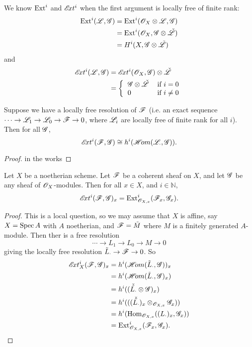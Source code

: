  \begin{corollary}\label{C:lec16}
 We know $\text{\rm Ext}^i$ and $\mathscr{E}\!xt^i$ when the first argument is locally
 free of finite rank:
 \begin{align*}
    \text{\rm Ext}^i(\mathscr{L},\mathscr{G}) &= \text{\rm Ext}^i(\mathscr{O}_X\otimes \mathscr{L},\mathscr{G})\\
        &= \text{\rm Ext}^i(\mathscr{O}_X,\mathscr{G}\otimes \check {\mathscr{L}})\\
        &= H^i(X,\mathscr{G}\otimes \check {\mathscr{L}})
 \end{align*}
 and
 \begin{align*}
    \Ext^i(\L,\G) &= \Ext^i(\O_X,\G)\otimes \check \L\\
        &=\left\{\begin{tabular}{ll}
            $\G\otimes \check \L$ & if $i=0$\\
            0 & if $i\not=0$\end{tabular} \right.
 \end{align*}
 \end{corollary}

 \begin{proposition}[III.6.5]
 Suppose we have a locally free resolution of $\mathscr{F}$ (i.e. an exact
 sequence $\cdots\to \mathscr{L}_1\to \mathscr{L}_0\to \mathscr{F}\to 0$, where $\mathscr{L}_i$ are
 locally free of finite rank for all $i$).  Then for all $\mathscr{G}$,
 \[
    \mathscr{E}\!xt^i(\mathscr{F},\mathscr{G})\cong h^i(\mathscr{H}\!om(\mathscr{L}_{\cdot},\mathscr{G})).
 \]
 \end{proposition}
 \begin{proof}
 in the works
 \end{proof}

 \begin{proposition}[III.6.8]
 Let $X$ be a noetherian scheme.  Let $\mathscr{F}$ be a coherent sheaf on
 $X$, and let $\mathscr{G}$ be any sheaf of $\mathscr{O}_X$-modules.  Then for all
 $x\in X$, and $i\in \mathbb{N}$,
 \[
    \mathscr{E}\!xt^i(\mathscr{F},\mathscr{G})_x = \text{\rm Ext}^i_{\mathscr{O}_{X,x}}(\mathscr{F}_x,\mathscr{G}_x).
 \]
 \end{proposition}
 \begin{proof}
 This is a local question, so we may assume that $X$ is affine,
 say $X=\text{\rm Spec\,} A$ with $A$ noetherian, and $\mathscr{F}=\tilde M$ where $M$
 is a finitely generated $A$-module.  Then ther is a free
 resolution
 \[
    \cdots \to L_1\to L_0\to M\to 0
 \]
 giving the locally free resolution $\tilde L_{\cdot}\to \mathscr{F} \to
 0$.  So
 \begin{align*}
  \mathscr{E}\!xt^i_X(\mathscr{F},\mathscr{G})_x &= h^i(\mathscr{H}\!om(\tilde L_{\cdot},\mathscr{G}))_x\\
    &= h^i(\mathscr{H}\!om(\tilde L_{\cdot},\mathscr{G})_x)\\
    &= h^i((\check{\tilde {L_{\cdot}}}\otimes \mathscr{G})_x)\\
    &= h^i(((\check{\tilde {L_{\cdot}}})_x\otimes_{\mathscr{O}_{X,x}} \mathscr{G}_x))\\
    &= h^i(\text{\rm Hom}_{\mathscr{O}_{X,x}}((L_{\cdot})_x,\mathscr{G}_x))\\
    &= \text{\rm Ext}^i_{\mathscr{O}_{X,x}}(\mathscr{F}_x,\mathscr{G}_x).
 \end{align*}
 \end{proof}

